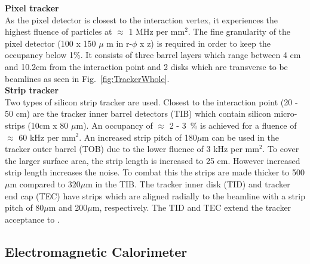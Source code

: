 \textbf{Pixel tracker}\\

As the pixel detector is closest to the interaction vertex, it experiences the highest fluence of particles at $\approx$ 1 MHz per mm$^{2}$. The fine granularity of the pixel detector (100 x 150 $\mu$ m in r-$\phi$ x z) is required in order to keep the occupancy below 1\%. It consists of three barrel layers which range between 4 cm and 10.2cm from the interaction point and 2 disks which are transverse to be beamlines as seen in Fig.~\ref{fig:TrackerWhole}.\\

\textbf{Strip tracker}\\
Two types of silicon strip tracker are used. Closest to the interaction point (20 - 50 cm) are the tracker inner barrel detectors (TIB) which contain silicon micro-strips (10cm x 80 $\mu$m). An occupancy of $\approx$ 2 - 3~\% is achieved for a fluence of $\approx$ 60 kHz per mm$^{2}$.
An increased strip pitch of 180$\mu$m can be used in the tracker outer barrel (TOB) due to the lower fluence of 3 kHz per mm$^{2}$. To cover the larger surface area, the strip length is increased to 25 cm. However increased strip length increases the noise. To combat this the strips are made thicker to 500 $\mu$m compared to 320$\mu$m in the TIB.
The tracker inner disk (TID) and tracker end cap (TEC) have strips which are aligned radially to the beamline with a strip pitch of 80$\mu$m and 200$\mu$m, respectively. The TID and TEC extend the tracker acceptance to .


\subsection{Electromagnetic Calorimeter}


